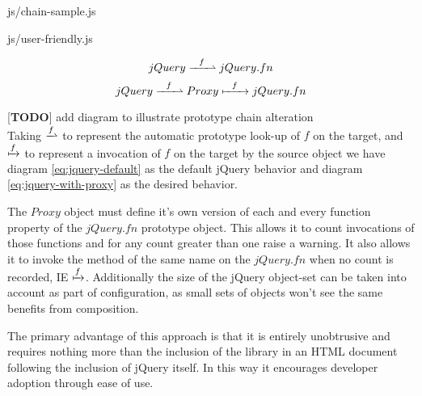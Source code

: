 \documentclass[preprint]{sigplanconf}
\begin{document}
\begin{lstinputlisting}[
    language=JavaScript,
    caption={Sources of Html objects},
    label={lst:chain-sample}
]{js/chain-sample.js}
\begin{lstinputlisting}[
    language=JavaScript,
    caption={User friendly overhead},
    label={lst:user-friendly}
]{js/user-friendly.js}
\begin{figure}[!ht]
\begin{equation} \label{eq:jquery-default}
 jQuery \xrightharpoonup{\ \ f\ \ } jQuery.fn
\end{equation}
\begin{equation} \label{eq:jquery-with-proxy}
 jQuery \xrightharpoonup{\ \ f\ \ } Proxy \xmapsto{\ \ f\ \ } jQuery.fn
\end{equation}
\end{figure}

[\textbf{TODO}] add diagram to illustrate prototype chain alteration
\\

Taking \begin{math}\xrightharpoonup{f}\end{math} to represent the automatic prototype look-up of \begin{math}f\end{math} on the target, and \begin{math}\xmapsto{f}\end{math} to represent a invocation of \begin{math}f\end{math} on the target by the source object we have diagram \ref{eq:jquery-default} as the default jQuery behavior and diagram \ref{eq:jquery-with-proxy} as the desired behavior.

The \begin{math}Proxy\end{math} object must define it's own version of each and every function property of the \begin{math}jQuery.fn\end{math} prototype object. This allows it to count invocations of those functions and for any count greater than one raise a warning. It also allows it to invoke the method of the same name on the \begin{math}jQuery.fn\end{math} when no count is recorded, IE \begin{math}\xmapsto{f}\end{math}. Additionally the size of the jQuery object-set can be taken into account as part of configuration, as small sets of objects won't see the same benefits from composition.

The primary advantage of this approach is that it is entirely unobtrusive and requires nothing more than the inclusion of the library in an HTML document following the inclusion of jQuery itself. In this way it encourages developer adoption through ease of use.


\end{lstinputlisting}
\end{lstinputlisting}
\end{document}

